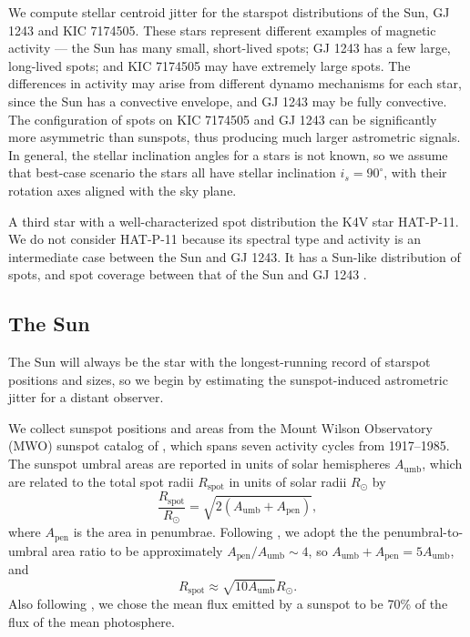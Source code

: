 We compute stellar centroid jitter for the starspot distributions of the Sun, GJ 1243 and KIC 7174505. These stars represent different examples of magnetic activity --- the Sun has many small, short-lived spots; GJ 1243 has a few large, long-lived spots; and KIC 7174505 may have extremely large spots. The differences in activity may arise from different dynamo mechanisms for each star, since the Sun has a convective envelope, and GJ 1243 may be fully convective. The configuration of spots on KIC 7174505 and GJ 1243 can be significantly more asymmetric than sunspots, thus producing much larger astrometric signals. In general, the stellar inclination angles for a stars is not known, so we assume that best-case scenario the stars all have stellar inclination $i_s = 90^\circ$, with their rotation axes aligned with the sky plane.

A third star with a well-characterized spot distribution the K4V star HAT-P-11. We do not consider HAT-P-11 because its spectral type and activity is an intermediate case between the Sun and GJ 1243. It has a Sun-like distribution of spots, and spot coverage between that of the Sun and GJ 1243 \citep{Morris2017a, Morris2017b, Davenport2015}. 

\subsection{The Sun} \label{sec:sun}

The Sun will always be the star with the longest-running record of starspot positions and sizes, so we begin by estimating the sunspot-induced astrometric jitter for a distant observer. 

We collect sunspot positions and areas from the Mount Wilson Observatory (MWO) sunspot catalog of \citet{Howard1984}, which spans seven activity cycles from 1917--1985. The sunspot umbral areas are reported in units of solar hemispheres $A_{\mathrm{umb}}$, which are related to the total spot radii $R_{\mathrm{spot}}$ in units of solar radii $R_\odot$ by
\begin{equation}
\frac{R_{\mathrm{spot}}}{R_\odot} = \sqrt{2 (A_{\mathrm{umb}} + A_{\mathrm{pen}})},
\end{equation}
where $A_{\mathrm{pen}}$ is the area in penumbrae. Following \citet{Solanki2003}, we adopt the the penumbral-to-umbral area ratio to be approximately $A_{\mathrm{pen}}/A_{\mathrm{umb}} \sim 4$, so $A_{\mathrm{umb}} + A_{\mathrm{pen}} = 5 A_{\mathrm{umb}}$, and 
\begin{equation}
R_{\mathrm{spot}} \approx \sqrt{10 A_{\mathrm{umb}}} R_\odot.
\end{equation}
Also following \citet{Solanki2003}, we chose the mean flux emitted by a sunspot to be 70\% of the flux of the mean photosphere. 

